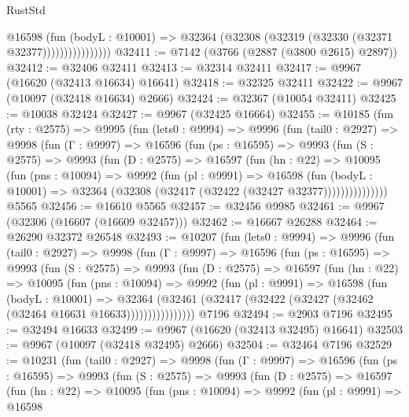 \begin{lexlean}{RustStd}
\begin{coremodule}
                        @16598
                          (fun (bodyL : @10001) =>
                          @32364 (@32308 (@32319 (@32330 (@32371 @32377))))))))))))))))
@32411 := @7142 (@3766 (@2887 (@3800 @2615) @2897))
@32412 := @32406 @32411
@32413 := @32314 @32411
@32417 := @9967 (@16620 (@32413 @16634) @16641)
@32418 := @32325 @32411
@32422 := @9967 (@10097 (@32418 @16634) @2666)
@32424 := @32367 (@10054 @32411)
@32425 := @10038 @32424
@32427 := @9967 (@32425 @16664)
@32455 := @10185
    (fun (rty : @2575) =>
    @9995
      (fun (lets0 : @9994) =>
      @9996
        (fun (tail0 : @2927) =>
        @9998
          (fun (Γ : @9997) =>
          @16596
            (fun (ps : @16595) =>
            @9993
              (fun (S : @2575) =>
              @9993
                (fun (D : @2575) =>
                @16597
                  (fun (hn : @22) =>
                  @10095
                    (fun (pns : @10094) =>
                    @9992
                      (fun (pl : @9991) =>
                      @16598
                        (fun (bodyL : @10001) =>
                        @32364 (@32308 (@32417 (@32422 (@32427 @32377)))))))))))))))
    @5565
@32456 := @16610 @5565
@32457 := @32456 @9985
@32461 := @9967 (@32306 (@16607 (@16609 @32457)))
@32462 := @16667 @26288
@32464 := @26290 @32372 @26548
@32493 := @10207
    (fun (lets0 : @9994) =>
    @9996
      (fun (tail0 : @2927) =>
      @9998
        (fun (Γ : @9997) =>
        @16596
          (fun (ps : @16595) =>
          @9993
            (fun (S : @2575) =>
            @9993
              (fun (D : @2575) =>
              @16597
                (fun (hn : @22) =>
                @10095
                  (fun (pns : @10094) =>
                  @9992
                    (fun (pl : @9991) =>
                    @16598
                      (fun (bodyL : @10001) =>
                      @32364
                        (@32461
                          (@32417 (@32422 (@32427 (@32462 (@32464 @16631 @16633))))))))))))))))
    @7196
@32494 := @2903 @7196
@32495 := @32494 @16633
@32499 := @9967 (@16620 (@32413 @32495) @16641)
@32503 := @9967 (@10097 (@32418 @32495) @2666)
@32504 := @32464 @7196
@32529 := @10231
    (fun (tail0 : @2927) =>
    @9998
      (fun (Γ : @9997) =>
      @16596
        (fun (ps : @16595) =>
        @9993
          (fun (S : @2575) =>
          @9993
            (fun (D : @2575) =>
            @16597
              (fun (hn : @22) =>
              @10095
                (fun (pns : @10094) =>
                @9992
                  (fun (pl : @9991) =>
                  @16598

\end{coremodule}
\end{lexlean}
